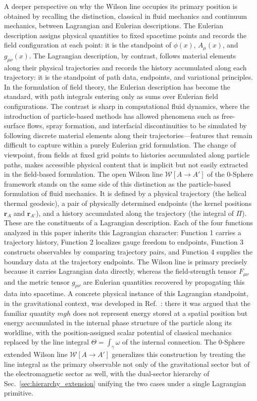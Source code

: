 \documentclass[%
 reprint, amsmath,amssymb, aps, prb, ]{revtex4-2}
\numberwithin{equation}{section}
\newcommand{\WL}{\mathcal{W}}
\begin{document}
A deeper perspective on why the Wilson line occupies its primary position is obtained by recalling the distinction, classical in fluid mechanics and continuum mechanics, between Lagrangian and Eulerian descriptions. The Eulerian description assigns physical quantities to fixed spacetime points and records the field configuration at each point: it is the standpoint of $\phi(x)$, $A_\mu(x)$, and $g_{\mu\nu}(x)$. The Lagrangian description, by contrast, follows material elements along their physical trajectories and records the history accumulated along each trajectory: it is the standpoint of path data, endpoints, and variational principles. In the formulation of field theory, the Eulerian description has become the standard, with path integrals entering only as sums over Eulerian field configurations. The contrast is sharp in computational fluid dynamics, where the introduction of particle-based methods has allowed phenomena such as free-surface flows, spray formation, and interfacial discontinuities to be simulated by following discrete material elements along their trajectories---features that remain difficult to capture within a purely Eulerian grid formulation. The change of viewpoint, from fields at fixed grid points to histories accumulated along particle paths, makes accessible physical content that is implicit but not easily extracted in the field-based formulation. The open Wilson line $\WL[A\to A']$ of the 0-Sphere framework stands on the same side of this distinction as the particle-based formulation of fluid mechanics. It is defined by a physical trajectory (the helical thermal geodesic), a pair of physically determined endpoints (the kernel positions $\mathbf{r}_A$ and $\mathbf{r}_{A'}$), and a history accumulated along the trajectory (the integral of $\Pi$). These are the constituents of a Lagrangian description. Each of the four functions analyzed in this paper inherits this Lagrangian character: Function 1 carries a trajectory history, Function 2 localizes gauge freedom to endpoints, Function 3 constructs observables by comparing trajectory pairs, and Function 4 supplies the boundary data at the trajectory endpoints. The Wilson line is primary precisely because it carries Lagrangian data directly, whereas the field-strength tensor $F_{\mu\nu}$ and the metric tensor $g_{\mu\nu}$ are Eulerian quantities recovered by propagating this data into spacetime. A concrete physical instance of this Lagrangian standpoint, in the gravitational context, was developed in Ref.~\cite{hanamura37}: there it was argued that the familiar quantity $mgh$ does not represent energy stored at a spatial position but energy accumulated in the internal phase structure of the particle along its worldline, with the position-assigned scalar potential of classical mechanics replaced by the line integral $\Theta = \int_\gamma \omega$ of the internal connection. The 0-Sphere extended Wilson line $\WL[A\to A']$ generalizes this construction by treating the line integral as the primary observable not only of the gravitational sector but of the electromagnetic sector as well, with the dual-sector hierarchy of Sec.~\ref{sec:hierarchy_extension} unifying the two cases under a single Lagrangian primitive.
\end{document}
